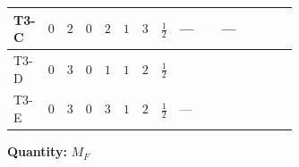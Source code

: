 \documentclass[8pt]{article}
\begin{document}
\begin{landscape}
\begin{longtable}{@{}llcccccc >{\raggedright\arraybackslash}p{0.21\linewidth} >{\raggedright\arraybackslash}p{0.21\linewidth} >{\raggedright\arraybackslash}p{0.21\linewidth}@{}}
\midrule
T3-C & $0$ & $2$ & $0$ & $2$ & $1$ & $3$ & $\frac{1}{2}$ & --- & --- & \scriptsize\adjustbox{max width=\linewidth}{$\begin{gathered} -\frac{3}{2} {g_1}^2 \left({M_F}\right)_{ij}\end{gathered}$} \\
\midrule
T3-D & $0$ & $3$ & $0$ & $1$ & $1$ & $2$ & $\frac{1}{2}$ & \scriptsize\adjustbox{max width=\linewidth}{$\begin{gathered} \frac{1}{4} (3 \left(\left({y_1}\right)^{T}\,\left({y_1}\right)^{*}\,{M_F}\right)_{ij}+2 \left({M_F}\,\left({y_2}\right)^{\dagger}\,{y_2}\right)_{ij})\end{gathered}$} & \scriptsize\adjustbox{max width=\linewidth}{$\begin{gathered} -\frac{9}{2} {g_2}^2 \left({M_F}\right)_{ij}\end{gathered}$} & \scriptsize\adjustbox{max width=\linewidth}{$\begin{gathered} -\frac{3}{2} {g_1}^2 \left({M_F}\right)_{ij}\end{gathered}$} \\
\midrule
T3-E & $0$ & $3$ & $0$ & $3$ & $1$ & $2$ & $\frac{1}{2}$ & --- & \scriptsize\adjustbox{max width=\linewidth}{$\begin{gathered} -\frac{9}{2} {g_2}^2 \left({M_F}\right)_{ij}\end{gathered}$} & \scriptsize\adjustbox{max width=\linewidth}{$\begin{gathered} -\frac{3}{2} {g_1}^2 \left({M_F}\right)_{ij}\end{gathered}$} \\
\midrule
\bottomrule
\end{longtable}
\clearpage
\noindent\textbf{Quantity: }$M_F$\par\smallskip

\end{landscape}
\end{document}
